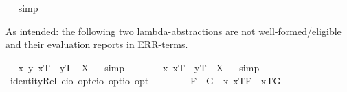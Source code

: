 \begin{isabellebody}
\isadelimproof
\ %
\endisadelimproof
%
\isatagproof
{}\isamarkupfalse%
\ simp\ \isamarkupfalse%
\ \ \ \ \ \ \ \ \ \ \ \ \ \ \ \ \ \ \ \ \ \ \ %
%
\endisatagproof
{\isafoldproof}%
%
\isadelimproof
%
\endisadelimproof
%
\begin{isamarkuptext}%
As intended: the following two lambda-abstractions are not well-formed/eligible 
  and their evaluation reports in ERR-terms.%
\end{isamarkuptext}%
\isamarkuptrue%
\ \isamarkupfalse%
\ {\isachardoublequoteopen}\isactrlbold {\isasymlambda}x\ y{\isachardot}\ x\isactrlsup T\ \isactrlbold {\isacharequal}\ y\isactrlsup T{\isacharparenright}\ {\isacharequal}\ X{\isachardoublequoteclose}%
\isadelimproof
\ %
\endisadelimproof
%
\isatagproof
{}\isamarkupfalse%
\ simp\ \isamarkupfalse%
\ \ \ %
%
\endisatagproof
{\isafoldproof}%
%
\isadelimproof
%
\endisadelimproof
\isanewline
\ \isamarkupfalse%
\ {\isachardoublequoteopen}{\isacharparenleft}\isactrlbold {\isasymlambda}x{\isachardot}\ x\isactrlsup T\ \isactrlbold {\isacharequal}\ y\isactrlsup T{\isacharparenright}\ {\isacharequal}\ X{\isachardoublequoteclose}%
\isadelimproof
\ %
\endisadelimproof
%
\isatagproof
{}\isamarkupfalse%
\ simp\ \isamarkupfalse%
\ \ \ %
%
\endisatagproof
{\isafoldproof}%
%
\isadelimproof
%
\endisadelimproof
%
\isamarkuptrue%
\ \isamarkupfalse%
\ identityRel{}{\isacharcolon}{\isacharcolon}{\isachardoublequoteopen}\ {\isacharparenleft}{\isacharparenleft}e{\isasymRightarrow}io{\isacharparenright}\ opt{\isacharparenright}{\isasymRightarrow}{\isacharparenleft}{\isacharparenleft}e{\isasymRightarrow}io{\isacharparenright}\ opt{\isacharparenright}{\isasymRightarrow}io\ opt{\isachardoublequoteclose}\ {\isacharparenleft}\ {\isachardoublequoteopen}\isactrlbold {\isacharequal}\ {}{}{\isacharparenright}\ \isanewline
\ \ \ \ {\isachardoublequoteopen}F{}\ \isactrlbold {\isacharequal}\ G{}\ {\isasymequiv}\ \isactrlbold {\isasymbox}{\isacharparenleft}\isactrlbold {\isasymforall}x{\isachardot}\ {\isasymlbrace}x\isactrlsup T{\isacharcomma}F{}{\isasymrbrace}\ \isactrlbold {\isasymequiv}\ {\isasymlbrace}x\isactrlsup T{\isacharcomma}G{}{\isasymrbrace}{\isacharparenright}{\isachardoublequoteclose}\isanewline

\end{isabellebody}

